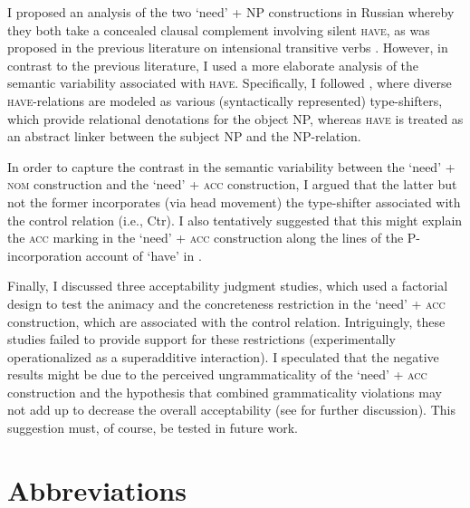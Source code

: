 \documentclass[output=paper,colorlinks,citecolor=brown]{langscibook}
\begin{document}
I proposed an analysis of the two `need' + NP constructions in Russian whereby they both take a concealed clausal complement involving silent \textsc{have}, as was proposed in the previous literature on intensional transitive verbs \citep[e.g.,][]{Harves2008}. However, in contrast to the previous literature, I used a more elaborate analysis of the semantic variability associated with \textsc{have}. Specifically, I followed \citet{Zaroukian.Beller2013}, where diverse \textsc{have}-relations are modeled as various (syntactically represented) type-shifters, which provide relational denotations for the object NP, whereas \textsc{have} is treated as an abstract linker between the subject NP and the NP-relation.

In order to capture the contrast in the semantic variability between the `need' + \textsc{nom} construction and the `need' + \textsc{acc} construction, I argued that the latter but not the former incorporates (via head movement) the type-shifter associated with the control relation (i.e., Ctr). I also tentatively suggested that this might explain the \textsc{acc} marking in the `need' + \textsc{acc} construction along the lines of the P-incorporation account of `have' in \citet{Freeze1992} \citep[see also][]{Kayne1993}.

    \largerpage %

Finally, I discussed three acceptability judgment studies, which used a factorial design to test the animacy and the concreteness restriction in the `need' + \textsc{acc} construction, which are associated with the control relation. Intriguingly, these studies failed to provide support for these restrictions (experimentally operationalized as a superadditive interaction). I speculated that the negative results might be due to the perceived ungrammaticality of the `need' + \textsc{acc} construction and the hypothesis that combined grammaticality violations may not add up to decrease the overall acceptability (see \citealt{Hofmeister.Casasanto.Staum.Sag2014} for further discussion). This suggestion must, of course, be tested in future work.

\section*{Abbreviations}
\end{document}
